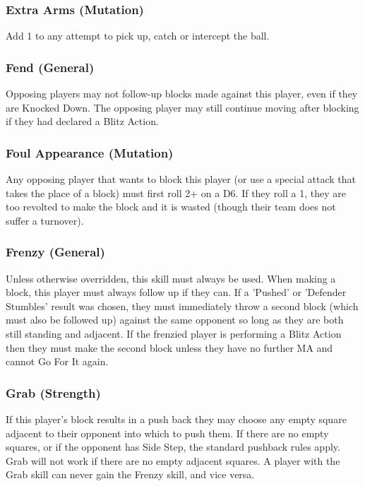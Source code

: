 \documentclass{article}
\begin{document}
\begin{multicols}{3}
\subsubsection{Extra Arms (Mutation)}
\par Add 1 to any attempt to pick up, catch or intercept the ball.

\subsubsection{Fend (General)}
\par Opposing players may not follow-up blocks made against this player, even if they are Knocked Down. The opposing player may still continue moving after blocking if they had declared a Blitz Action.

\subsubsection{Foul Appearance (Mutation)}
\par Any opposing player that wants to block this player (or use a special attack that takes the place of a block) must first roll 2+ on a D6. If they roll a 1, they are too revolted to make the block and it is wasted (though their team does not suffer a turnover).

\subsubsection{Frenzy (General)}
\par Unless otherwise overridden, this skill must always be used. When making a block, this player must always follow up if they can. If a 'Pushed' or 'Defender Stumbles' result was chosen, they must immediately throw a second block (which must also be followed up) against the same opponent so long as they are both still standing and adjacent. If the frenzied player is performing a Blitz Action then they must make the second block unless they have no further MA and cannot Go For It again.

\subsubsection{Grab (Strength)}
\par If this player's block results in a push back they may choose any empty square adjacent to their opponent into which to push them. If there are no empty squares, or if the opponent has Side Step, the standard pushback rules apply. Grab will not work if there are no empty adjacent squares. A player with the Grab skill can never gain the Frenzy skill, and vice versa.


\end{multicols}
\end{document}
